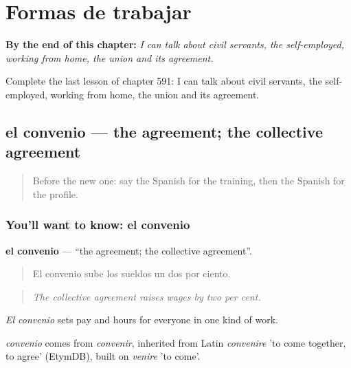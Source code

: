 
\chapter{Formas de trabajar}
\label{ch:es-formas-de-trabajar}

\begin{chapteropening}
\textbf{By the end of this chapter:} \emph{I can talk about civil servants, the self-employed, working from home, the union and its agreement.}

Complete the last lesson of chapter 591: I can talk about civil servants, the self-employed, working from home, the union and its agreement.
\end{chapteropening}

\section[el convenio]{el convenio — the agreement; the collective agreement}

\label{lesson:ES-C591-convenio}



\begin{quote}
Before the new one: say the Spanish for the training, then the Spanish for the profile.
\end{quote}

\subsection*{You'll want to know: el convenio}
\textbf{el convenio} — \textquotedblleft{}the agreement; the collective agreement\textquotedblright{}.

\begin{quote}
El convenio sube los sueldos un dos por ciento.
\end{quote}

\begin{quote}
\emph{The collective agreement raises wages by two per cent.}
\end{quote}

\emph{El convenio} sets pay and hours for everyone in one kind of work.

\begin{cousinweb}
\emph{convenio} comes from \emph{convenir}, inherited from Latin \emph{convenire} 'to come together, to agree' (EtymDB), built on \emph{venire} 'to come'.
\end{cousinweb}

